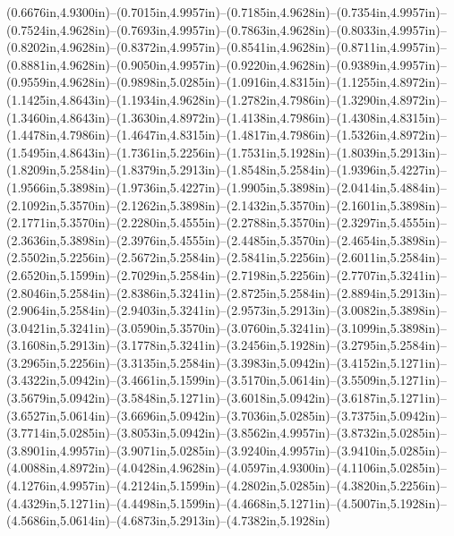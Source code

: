 (0.6676in,4.9300in)--(0.7015in,4.9957in)--(0.7185in,4.9628in)--(0.7354in,4.9957in)--(0.7524in,4.9628in)--(0.7693in,4.9957in)--(0.7863in,4.9628in)--(0.8033in,4.9957in)--(0.8202in,4.9628in)--(0.8372in,4.9957in)--(0.8541in,4.9628in)--(0.8711in,4.9957in)--(0.8881in,4.9628in)--(0.9050in,4.9957in)--(0.9220in,4.9628in)--(0.9389in,4.9957in)--(0.9559in,4.9628in)--(0.9898in,5.0285in)--(1.0916in,4.8315in)--(1.1255in,4.8972in)--(1.1425in,4.8643in)--(1.1934in,4.9628in)--(1.2782in,4.7986in)--(1.3290in,4.8972in)--(1.3460in,4.8643in)--(1.3630in,4.8972in)--(1.4138in,4.7986in)--(1.4308in,4.8315in)--(1.4478in,4.7986in)--(1.4647in,4.8315in)--(1.4817in,4.7986in)--(1.5326in,4.8972in)--(1.5495in,4.8643in)--(1.7361in,5.2256in)--(1.7531in,5.1928in)--(1.8039in,5.2913in)--(1.8209in,5.2584in)--(1.8379in,5.2913in)--(1.8548in,5.2584in)--(1.9396in,5.4227in)--(1.9566in,5.3898in)--(1.9736in,5.4227in)--(1.9905in,5.3898in)--(2.0414in,5.4884in)--(2.1092in,5.3570in)--(2.1262in,5.3898in)--(2.1432in,5.3570in)--(2.1601in,5.3898in)--(2.1771in,5.3570in)--(2.2280in,5.4555in)--(2.2788in,5.3570in)--(2.3297in,5.4555in)--(2.3636in,5.3898in)--(2.3976in,5.4555in)--(2.4485in,5.3570in)--(2.4654in,5.3898in)--(2.5502in,5.2256in)--(2.5672in,5.2584in)--(2.5841in,5.2256in)--(2.6011in,5.2584in)--(2.6520in,5.1599in)--(2.7029in,5.2584in)--(2.7198in,5.2256in)--(2.7707in,5.3241in)--(2.8046in,5.2584in)--(2.8386in,5.3241in)--(2.8725in,5.2584in)--(2.8894in,5.2913in)--(2.9064in,5.2584in)--(2.9403in,5.3241in)--(2.9573in,5.2913in)--(3.0082in,5.3898in)--(3.0421in,5.3241in)--(3.0590in,5.3570in)--(3.0760in,5.3241in)--(3.1099in,5.3898in)--(3.1608in,5.2913in)--(3.1778in,5.3241in)--(3.2456in,5.1928in)--(3.2795in,5.2584in)--(3.2965in,5.2256in)--(3.3135in,5.2584in)--(3.3983in,5.0942in)--(3.4152in,5.1271in)--(3.4322in,5.0942in)--(3.4661in,5.1599in)--(3.5170in,5.0614in)--(3.5509in,5.1271in)--(3.5679in,5.0942in)--(3.5848in,5.1271in)--(3.6018in,5.0942in)--(3.6187in,5.1271in)--(3.6527in,5.0614in)--(3.6696in,5.0942in)--(3.7036in,5.0285in)--(3.7375in,5.0942in)--(3.7714in,5.0285in)--(3.8053in,5.0942in)--(3.8562in,4.9957in)--(3.8732in,5.0285in)--(3.8901in,4.9957in)--(3.9071in,5.0285in)--(3.9240in,4.9957in)--(3.9410in,5.0285in)--(4.0088in,4.8972in)--(4.0428in,4.9628in)--(4.0597in,4.9300in)--(4.1106in,5.0285in)--(4.1276in,4.9957in)--(4.2124in,5.1599in)--(4.2802in,5.0285in)--(4.3820in,5.2256in)--(4.4329in,5.1271in)--(4.4498in,5.1599in)--(4.4668in,5.1271in)--(4.5007in,5.1928in)--(4.5686in,5.0614in)--(4.6873in,5.2913in)--(4.7382in,5.1928in) 